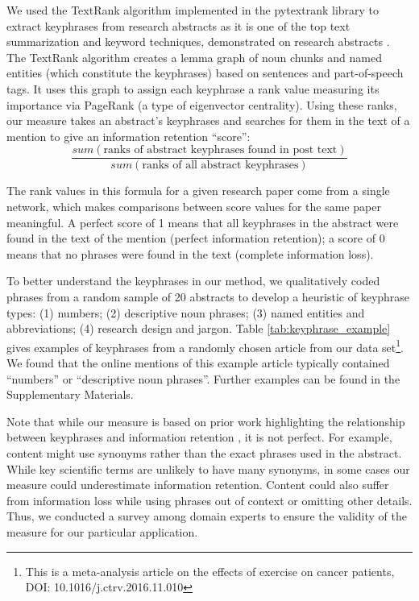 \documentclass[letterpaper]{article} %
\begin{document}
We used the TextRank algorithm implemented in the pytextrank library to extract keyphrases from research abstracts as it is one of the top text summarization and keyword techniques, demonstrated on research abstracts \citep{mihalceaTextRankBringingOrder2004}.
The TextRank algorithm creates a lemma graph of noun chunks and named entities (which constitute the keyphrases) based on sentences and part-of-speech tags. It uses this graph to assign each keyphrase a rank value measuring its importance via PageRank (a type of eigenvector centrality). %
Using these ranks, our measure takes an abstract's keyphrases and searches for them in the text of a mention to give an information retention ``score'':
$$\frac{sum(\text{ranks of abstract keyphrases found in post text})}{sum(\text{ranks of all abstract keyphrases})}$$

The rank values in this formula for a given research paper come from a single network, which makes comparisons between score values for the same paper meaningful. A perfect score of 1 means that all keyphrases in the abstract were found in the text of the mention (perfect information retention); a score of 0 means that no phrases were found in the text (complete information loss). 

To better understand the keyphrases in our method, we qualitatively coded phrases from a random sample of 20 abstracts to develop a heuristic of keyphrase types: (1) numbers; (2) descriptive noun phrases; (3) named entities and abbreviations; (4) research design and jargon. Table \ref{tab:keyphrase_example} gives examples of keyphrases from a randomly chosen article from our data set\footnote{This is a meta-analysis article on the effects of exercise on cancer patients, DOI: 10.1016/j.ctrv.2016.11.010}. We found that the online mentions of this example article typically contained ``numbers'' or ``descriptive noun phrases''. Further examples can be found in the Supplementary Materials.

Note that while our measure is based on prior work highlighting the relationship between keyphrases and information retention \cite{ribeiroMessageDistortionInformation2019}, it is not perfect. For example, content might use synonyms rather than the exact phrases used in the abstract. While key scientific terms are unlikely to have many synonyms, in some cases our measure could underestimate information retention. Content could also suffer from information loss while using phrases out of context or omitting other details. Thus, we conducted a survey among domain experts to ensure the validity of the measure for our particular application. 
\end{document}
